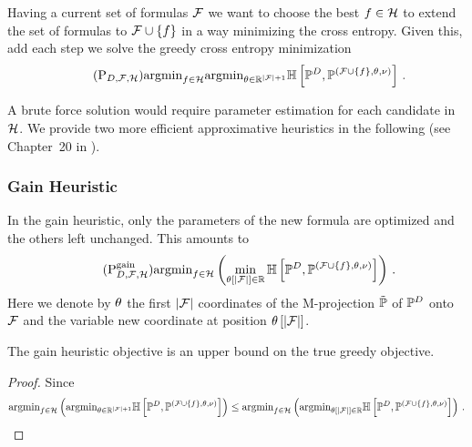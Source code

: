 Having a current set of formulas $\mathcal{F}$ we want to choose the best $f\in\mathcal{H}$ to extend the set of formulas to $\mathcal{F}\cup\{f\}$ in a way minimizing the cross entropy.
Given this, add each step we solve the greedy cross entropy minimization
\begin{align}\label{prob:perfectGreedy}\tag{$\mathrm{P}_{\datamap,\formulaset,\fselectionmap}$}
	\argmin_{\formula\in\fselectionmap} \argmin_{\canparam\in\rr^{\cardof{\formulaset}+1}} 
	\centropyof{\empdistribution}{\expdistof{(\formulaset\cup\{\formula\},\canparam,\basemeasure)}} \, . 
\end{align}


A brute force solution would require parameter estimation for each candidate in $\mathcal{H}$.
We provide two more efficient approximative heuristics in the following (see Chapter~20 in \cite{koller_probabilistic_2009}).


\subsubsection{Gain Heuristic}

In the gain heuristic, only the parameters of the new formula are optimized and the others left unchanged.
This amounts to 
\begin{align}\label{prob:greedyGain}\tag{$\mathrm{P}^{\mathrm{gain}}_{\datamap,\formulaset,\fselectionmap}$}
	\argmin_{\formula\in\fselectionmap} \left ( \min_{\canparamat{\cardof{\formulaset}}\in\rr} 
	\centropyof{\empdistribution}{\expdistof{(\formulaset\cup\{\formula\},\canparam,\basemeasure)}} \right) \, . 
\end{align}
Here we denote by $\theta$ the first $\left|\mathcal{F}\right|$ coordinates of the M-projection $\tilde{\mathbb{P}}$  of $\mathbb{P}^{D}$ onto $\mathcal{F}$ and the variable new coordinate at position $\theta\left[\left|\mathcal{F}\right|\right]$.

\begin{lemma}
	The gain heuristic objective is an upper bound on the true greedy objective. 
\end{lemma}
\begin{proof}
Since
\begin{align*}
	\mathrm{argmin}_{f\in\mathcal{H}} \left( \mathrm{argmin}_{\theta\in\mathbb{R}^{\left|\mathcal{F}\right|+1}} 
	\mathbb{H}\left[\mathbb{P}^{D},\mathbb{P}^{(\mathcal{F}\cup\{f\},\theta,\nu)}\right] \right)
	\leq 	\mathrm{argmin}_{f\in\mathcal{H}} \left ( \mathrm{argmin}_{\theta\left[\left|\mathcal{F}\right|\right]\in\mathbb{R}} 
	\mathbb{H}\left[\mathbb{P}^{D},\mathbb{P}^{(\mathcal{F}\cup\{f\},\theta,\nu)}\right] \right) \, . 
\end{align*}
\end{proof}


